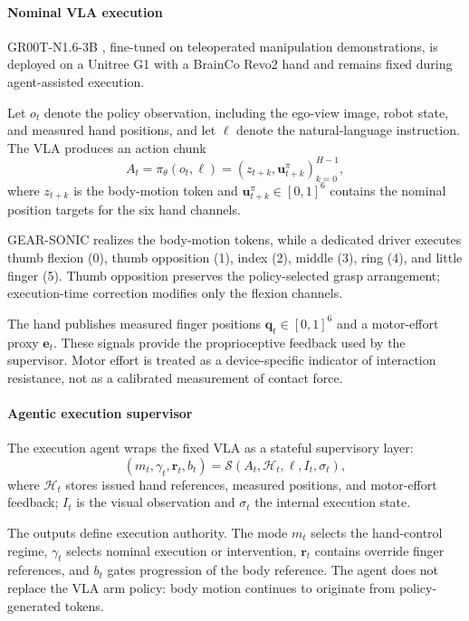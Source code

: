 \documentclass[letterpaper,10pt,conference]{ieeeconf}
\begin{document}
\paragraph{Nominal VLA execution}
GR00T-N1.6-3B \cite{groot}, fine-tuned on teleoperated manipulation
demonstrations, is deployed on a Unitree G1 with a BrainCo Revo2 hand and
remains fixed during agent-assisted execution.

Let $o_t$ denote the policy observation, including the ego-view image, robot
state, and measured hand positions, and let $\ell$ denote the natural-language
instruction. The VLA produces an action chunk
\begin{equation}
A_t=\pi_\theta(o_t,\ell)
=
\left(
z_{t+k},\mathbf{u}^{\pi}_{t+k}
\right)_{k=0}^{H-1},
\label{eq:policy}
\end{equation}
where $z_{t+k}$ is the body-motion token and
$\mathbf{u}^{\pi}_{t+k}\in[0,1]^6$ contains the nominal position targets for
the six hand channels.

GEAR-SONIC \cite{sonic} realizes the body-motion tokens, while a dedicated
driver executes thumb flexion (0), thumb opposition (1), index (2), middle
(3), ring (4), and little finger (5). Thumb opposition preserves the
policy-selected grasp arrangement; execution-time correction modifies only
the flexion channels.

The hand publishes measured finger positions
$\mathbf{q}_t\in[0,1]^6$ and a motor-effort proxy $\mathbf{e}_t$. These signals
provide the proprioceptive feedback used by the supervisor. Motor effort is
treated as a device-specific indicator of interaction resistance, not as a
calibrated measurement of contact force.

\paragraph{Agentic execution supervisor}
The execution agent wraps the fixed VLA as a stateful supervisory layer:
\begin{equation}
\left(
m_t,\gamma_t,\mathbf{r}_t,b_t
\right)
=
\mathcal{S}
\left(
A_t,\mathcal{H}_t,\ell,I_t,\sigma_t
\right),
\label{eq:supervisor}
\end{equation}
where $\mathcal{H}_t$ stores issued hand references, measured positions, and
motor-effort feedback; $I_t$ is the visual observation and $\sigma_t$ the
internal execution state.

The outputs define execution authority. The mode $m_t$ selects the hand-control
regime, $\gamma_t$ selects nominal execution or intervention,
$\mathbf{r}_t$ contains override finger references, and $b_t$ gates
progression of the body reference. The agent does not replace the VLA arm
policy: body motion continues to originate from policy-generated tokens.
\end{document}
